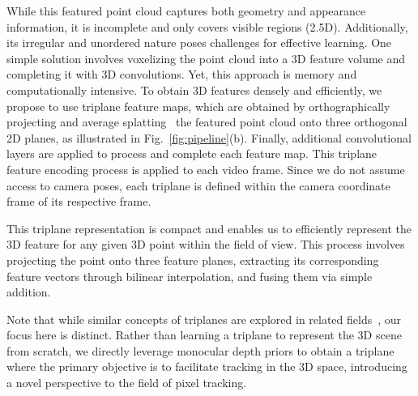 While this featured point cloud captures both geometry and appearance information, it is incomplete and only covers visible regions (2.5D). Additionally, its irregular and unordered nature poses challenges for effective learning. One simple solution involves voxelizing the point cloud into a 3D feature volume and completing it with 3D convolutions. Yet, this approach is memory and computationally intensive. To obtain 3D features densely and efficiently, we propose to use triplane feature maps, which are obtained by orthographically projecting and average splatting~\cite{softsplat} the featured point cloud onto three orthogonal 2D planes, as illustrated in Fig.~\ref{fig:pipeline}(b).
Finally, additional convolutional layers are applied to process and complete each feature map. This triplane feature encoding process is applied to each video frame. Since we do not assume access to camera poses, each triplane is defined within the camera coordinate frame of its respective frame.

This triplane representation is compact and enables us to efficiently represent the 3D feature for any given 3D point within the field of view. This process involves projecting the point onto three feature planes, extracting its corresponding feature vectors through bilinear interpolation, and fusing them via simple addition.

Note that while similar concepts of triplanes are explored in related fields~\cite{peng2020convolutional,wang2023alto,chan2022efficient}, our focus here is distinct. Rather than learning a triplane to represent the 3D scene from scratch, we directly leverage monocular depth priors to obtain a triplane where the primary objective is to facilitate tracking in the 3D space, introducing a novel perspective to the field of pixel tracking.


